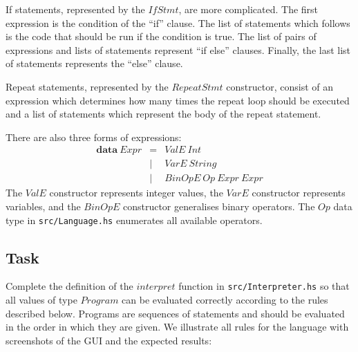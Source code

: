 \documentclass{cs256-shared/cs256}
\begin{document}
If statements, represented by the $\mathit{IfStmt}$, are more complicated. The first expression is the condition of the ``if'' clause. The list of statements which follows is the code that should be run if the condition is true. The list of pairs of expressions and lists of statements represent ``if else'' clauses. Finally, the last list of statements represents the ``else'' clause.

Repeat statements, represented by the $\mathit{RepeatStmt}$ constructor, consist of an expression which determines how many times the repeat loop should be executed and a list of statements which represent the body of the repeat statement.

There are also three forms of expressions:
\begin{displaymath}
\begin{array}{lcl}
\mathbf{data}~\mathit{Expr} & = & \mathit{ValE}~\mathit{Int} \\
& \mid & \mathit{VarE}~\mathit{String} \\
& \mid & \mathit{BinOpE}~\mathit{Op}~\mathit{Expr}~\mathit{Expr}
\end{array}
\end{displaymath}
The $\mathit{ValE}$ constructor represents integer values, the $\mathit{VarE}$ constructor represents variables, and the $\mathit{BinOpE}$ constructor generalises binary operators. The $\mathit{Op}$ data type in \texttt{src/Language.hs} enumerates all available operators.

\subsection*{Task}

Complete the definition of the $\mathit{interpret}$ function in \texttt{src/Interpreter.hs} so that all values of type $\mathit{Program}$ can be evaluated correctly according to the rules described below. Programs are sequences of statements and should be evaluated in the order in which they are given. We illustrate all rules for the language with screenshots of the GUI and the expected results:
\end{document}
